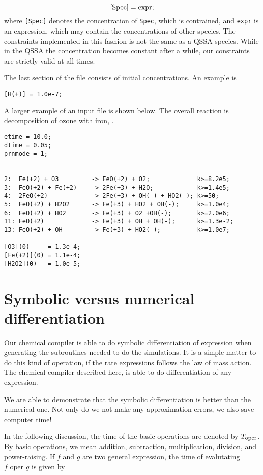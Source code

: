 \begin{equation}
{\rm [Spec]} ={\rm  expr;}
\end{equation}
where {\tt [Spec]} denotes the concentration of {\tt Spec}, which is
contrained, and {\tt expr} is an expression, which may contain the
concentrations of other species. The constraints implemented in this
fashion is not the same as a QSSA species. While in the QSSA the
concentration becomes constant after a while, our constraints are
strictly valid at all times.

The last section of the file consists of initial concentrations. An
example is

\begin{verbatim}
[H(+)] = 1.0e-7;
\end{verbatim}

A larger example of an input file is shown below. The overall reaction
is decomposition of ozone with iron, \cite{Frank}.

\begin{verbatim}
etime = 10.0;
dtime = 0.05;
prnmode = 1;


2:  Fe(+2) + O3         -> FeO(+2) + O2;             k>=8.2e5;
3:  FeO(+2) + Fe(+2)    -> 2Fe(+3) + H2O;            k>=1.4e5;
4:  2FeO(+2)            -> 2Fe(+3) + OH(-) + HO2(-); k>=50;
5:  FeO(+2) + H2O2      -> Fe(+3) + HO2 + OH(-);     k>=1.0e4;
6:  FeO(+2) + HO2       -> Fe(+3) + O2 +OH(-);       k>=2.0e6;
11: FeO(+2)             -> Fe(+3) + OH + OH(-);      k>=1.3e-2;
13: FeO(+2) + OH        -> Fe(+3) + HO2(-);          k>=1.0e7;

[O3](0)     = 1.3e-4;
[Fe(+2)](0) = 1.1e-4;
[H2O2](0)   = 1.0e-5;
\end{verbatim}

\section{Symbolic versus numerical differentiation}
Our chemical compiler is able to do symbolic differentiation of
expression when generating the subroutines needed to do the
simulations. It is a simple matter to do this kind of operation, if
the rate expressions follows the law of mass action. The chemical
compiler described here, is able to do differentiation of any
expression. 

We are able to demonstrate that the symbolic differentiation is
better than the numerical one. Not only do we not make any
approximation errors, we also save computer time!

In the following discussion, the time of the basic operations are
denoted by $T_{\mbox{{\footnotesize oper}}}$. By basic operations, we mean addition,
subtraction, multiplication, division, and power-raising. If $f$ and
$g$ are two general expression, the time of evalutating $f \mbox{ oper }
g$ is given by

